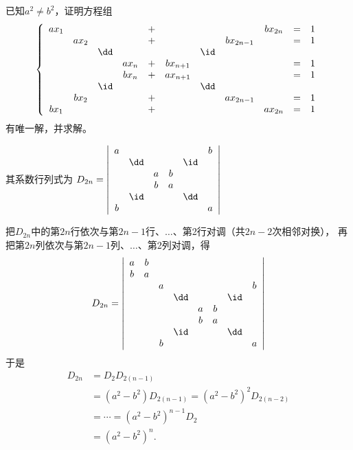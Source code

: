 \begin{frame}

\begin{testexample} 
  已知$a^2\ne b^2$，证明方程组
  $$
  \left\{
    \begin{array}{ccccccccccc}
      ax_1&&&&+&&&&bx_{2n}&=&1\\
          &ax_2&&&+&&&bx_{2n-1}&&=&1\\
          &&\dd&&&&\id&&&&\\
          &&&ax_n&+&bx_{n+1}&&&&=&1\\
          &&&bx_n&+&ax_{n+1}&&&&=&1\\
          &&\id&&&&\dd&&&&\\
          &bx_2&&&+&&&ax_{2n-1}&&=&1\\
      bx_1&&&&+&&&&ax_{2n}&=&1\\
    \end{array}
  \right.
  $$
  有唯一解，并求解。
\end{testexample}

\begin{jie}
其系数行列式为
$
D_{2n} = \left|
\begin{array}{cccccc}
a &     & & & & b \\
& \dd & & & \id & \\
&   & a & b &  & \\
&   & b & a &  &  \\
& \id & & & \dd & \\
b &     & & & & a
\end{array}
\right|
$





把$D_{2n}$中的第$2n$行依次与第$2n-1$行、$\ldots$、第2行对调（共$2n-2$次相邻对换），
再把第$2n$列依次与第$2n-1$列、$\ldots$、第2列对调，得
$$
D_{2n} = \left|
\begin{array}{cccccccc}
a & b &   &      & & & &  \\
b & a &   & & &  & &\\
&   & a & & &  & & b \\
&   &   & \dd &  &  & \id &   \\
&   &   &     & a& b& & \\
&   &   &     & b& a& & \\
&   &   & \id &  &  & \dd &   \\
&   & b & & &  & & a
\end{array}
\right|
$$
于是
$$
\begin{array}{ll}
D_{2n} & = D_2 D_{2(n-1)}  \\[0.4cm]
& = (a^2-b^2)D_{2(n-1)} 
= (a^2-b^2)^2 D_{2(n-2)}\\[0.4cm]
& = \cdots 
= (a^2-b^2)^{n-1}D_{2} \\[0.4cm]
& = (a^2-b^2)^n.      
\end{array}
$$







\end{jie}
\end{frame}
